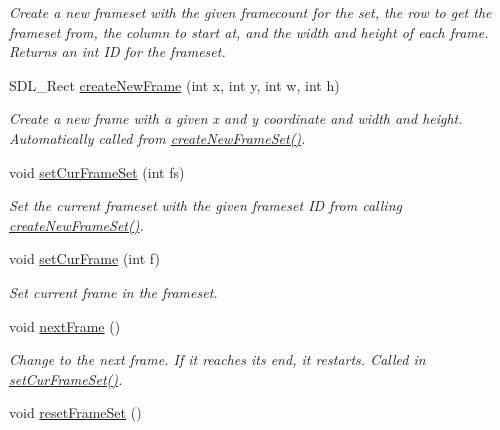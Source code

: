 \begin{DoxyCompactItemize}
\begin{DoxyCompactList}\small\item\em Create a new frameset with the given framecount for the set, the row to get the frameset from, the column to start at, and the width and height of each frame. Returns an int ID for the frameset. \end{DoxyCompactList}\item 
S\+D\+L\+\_\+\+Rect \hyperlink{classObject_a7a2350db0bae3e53ca9f928e08241159}{create\+New\+Frame} (int x, int y, int w, int h)\hypertarget{classObject_a7a2350db0bae3e53ca9f928e08241159}{}\label{classObject_a7a2350db0bae3e53ca9f928e08241159}

\begin{DoxyCompactList}\small\item\em Create a new frame with a given x and y coordinate and width and height. Automatically called from \hyperlink{classObject_a21238c368f570c14722cb00b74353732}{create\+New\+Frame\+Set()}. \end{DoxyCompactList}\item 
void \hyperlink{classObject_a061542647f10e3f30565ad9f56dc64c4}{set\+Cur\+Frame\+Set} (int fs)\hypertarget{classObject_a061542647f10e3f30565ad9f56dc64c4}{}\label{classObject_a061542647f10e3f30565ad9f56dc64c4}

\begin{DoxyCompactList}\small\item\em Set the current frameset with the given frameset ID from calling \hyperlink{classObject_a21238c368f570c14722cb00b74353732}{create\+New\+Frame\+Set()}. \end{DoxyCompactList}\item 
void \hyperlink{classObject_aef259fb0225c8995ec2c0ebe04c98cd9}{set\+Cur\+Frame} (int f)\hypertarget{classObject_aef259fb0225c8995ec2c0ebe04c98cd9}{}\label{classObject_aef259fb0225c8995ec2c0ebe04c98cd9}

\begin{DoxyCompactList}\small\item\em Set current frame in the frameset. \end{DoxyCompactList}\item 
void \hyperlink{classObject_a2c123e98f36c3779f5172afefacbf69c}{next\+Frame} ()\hypertarget{classObject_a2c123e98f36c3779f5172afefacbf69c}{}\label{classObject_a2c123e98f36c3779f5172afefacbf69c}

\begin{DoxyCompactList}\small\item\em Change to the next frame. If it reaches its end, it restarts. Called in \hyperlink{classObject_a061542647f10e3f30565ad9f56dc64c4}{set\+Cur\+Frame\+Set()}. \end{DoxyCompactList}\item 
void \hyperlink{classObject_ab2a55c6e2908f754992cc1c281b01be8}{reset\+Frame\+Set} ()\hypertarget{classObject_ab2a55c6e2908f754992cc1c281b01be8}{}\label{classObject_ab2a55c6e2908f754992cc1c281b01be8}


\end{DoxyCompactItemize}
